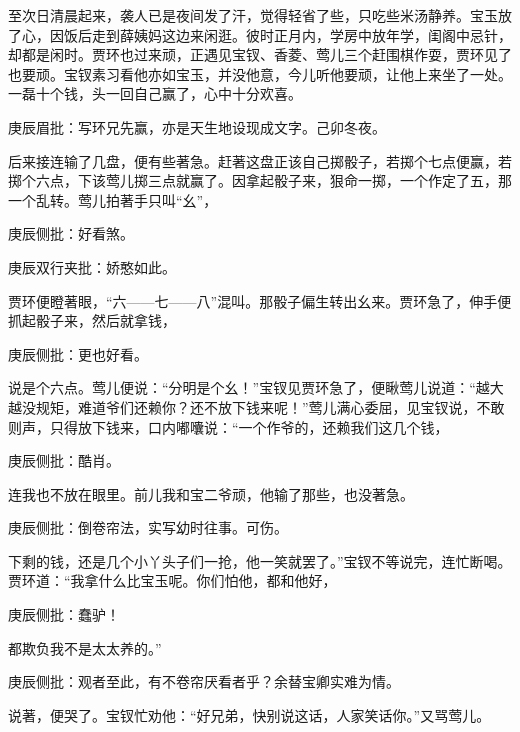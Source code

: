 \begin{parag}


    至次日清晨起来，袭人已是夜间发了汗，觉得轻省了些，只吃些米汤静养。宝玉放了心，因饭后走到薛姨妈这边来闲逛。彼时正月内，学房中放年学，闺阁中忌针，却都是闲时。贾环也过来顽，正遇见宝钗、香菱、莺儿三个赶围棋作耍，贾环见了也要顽。宝钗素习看他亦如宝玉，并没他意，今儿听他要顽，让他上来坐了一处。一磊十个钱，头一回自己赢了，心中十分欢喜。\begin{note}庚辰眉批：写环兄先赢，亦是天生地设现成文字。己卯冬夜。\end{note}后来接连输了几盘，便有些著急。赶著这盘正该自己掷骰子，若掷个七点便赢，若掷个六点，下该莺儿掷三点就赢了。因拿起骰子来，狠命一掷，一个作定了五，那一个乱转。莺儿拍著手只叫“幺”，\begin{note}庚辰侧批：好看煞。\end{note}\begin{note}庚辰双行夹批：娇憨如此。\end{note}贾环便瞪著眼，“六——七——八”混叫。那骰子偏生转出幺来。贾环急了，伸手便抓起骰子来，然后就拿钱，\begin{note}庚辰侧批：更也好看。\end{note}说是个六点。莺儿便说：“分明是个幺！”宝钗见贾环急了，便瞅莺儿说道：“越大越没规矩，难道爷们还赖你？还不放下钱来呢！”莺儿满心委屈，见宝钗说，不敢则声，只得放下钱来，口内嘟囔说：“一个作爷的，还赖我们这几个钱，\begin{note}庚辰侧批：酷肖。\end{note}连我也不放在眼里。前儿我和宝二爷顽，他输了那些，也没著急。\begin{note}庚辰侧批：倒卷帘法，实写幼时往事。可伤。\end{note}下剩的钱，还是几个小丫头子们一抢，他一笑就罢了。”宝钗不等说完，连忙断喝。贾环道：“我拿什么比宝玉呢。你们怕他，都和他好，\begin{note}庚辰侧批：蠢驴！\end{note}都欺负我不是太太养的。”\begin{note}庚辰侧批：观者至此，有不卷帘厌看者乎？余替宝卿实难为情。\end{note}说著，便哭了。宝钗忙劝他：“好兄弟，快别说这话，人家笑话你。”又骂莺儿。
\end{parag}


